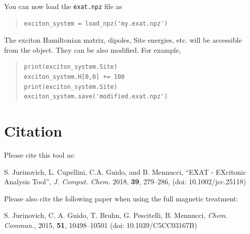 \documentclass[a4paper,11pt]{article}
\begin{document}
You can now load the \texttt{exat.npz} file as
\begin{framed}
\begin{quote}
\begin{verbatim}
exciton_system = load_npz('my.exat.npz')
\end{verbatim}
\end{quote}
\end{framed}

The exciton Hamiltonian matrix, dipoles, Site energies, etc. will be accessible from the object. They can be also modified. For example,
\begin{framed}
\begin{quote}
\begin{verbatim}
print(exciton_system.Site)
exciton_system.H[0,0] += 100 
print(exciton_system.Site)
exciton_system.save('modified.exat.npz')
\end{verbatim}
\end{quote}
\end{framed}

\section{Citation}

Please cite this tool as: 

S. Jurinovich, L. Cupellini, C.A. Guido, and B. Mennucci,  ``EXAT - EXcitonic Analysis Tool'', \emph{J. Comput. Chem.} 2018, \textbf{39}, 279--286,   (doi: 10.1002/jcc.25118)


Please also cite the following paper when using the full magnetic treatment:

S. Jurinovich, C. A. Guido, T. Bruhn, G. Pescitelli, B. Mennucci,  \emph{Chem. Commun.}, 2015, \textbf{51}, 10498--10501 (doi: 10.1039/C5CC03167B)
\end{document}
